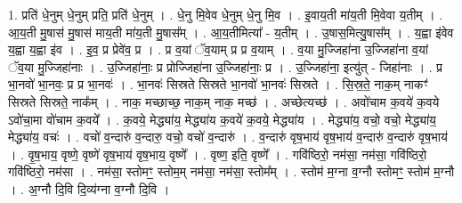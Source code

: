 \documentclass[17pt]{extarticle}
\begin{document}
1. प्रति॑ धे॒नुम् धे॒नुम् प्रति॒ प्रति॑ धे॒नुम् । . धे॒नु मि॒वेव धे॒नुम् धे॒नु मि॒व । . इ॒वाय॒ती मा॑य॒ती मि॒वेवा य॒तीम् । . आ॒य॒ती मु॒षास॑ मु॒षास॑ माय॒ती मा॑य॒ती मु॒षास᳚म् । . आ॒य॒तीमित्या᳚ - य॒तीम् । . उ॒षास॒मित्यु॒षास᳚म् । . य॒ह्वा इ॑वेव य॒ह्वा य॒ह्वा इ॑व । . इ॒व॒ प्र प्रेवे॑व॒ प्र । . प्र व॒यां ॅव॒याम् प्र प्र व॒याम् । . व॒या मु॒ज्जिहा॑ना उ॒ज्जिहा॑ना व॒यां ॅव॒या मु॒ज्जिहा॑नाः । . उ॒ज्जिहा॑नाः॒ प्र प्रोज्जिहा॑ना उ॒ज्जिहा॑नाः॒ प्र । . उ॒ज्जिहा॑ना॒ इत्यु॑त् - जिहा॑नाः । . प्र भा॒नवो॑ भा॒नवः॒ प्र प्र भा॒नवः॑ । . भा॒नवः॑ सिस्रते सिस्रते भा॒नवो॑ भा॒नवः॑ सिस्रते । . सि॒स्र॒ते॒ नाक॒म् नाकꣳ॑ सिस्रते सिस्रते॒ नाक᳚म् । . नाक॒ मच्छाच्छ॒ नाक॒म् नाक॒ मच्छ॑ । . अच्छेत्यच्छ॑ । . अवो॑चाम क॒वये॑ क॒वये ऽवो॑चा॒मा वो॑चाम क॒वये᳚ । . क॒वये॒ मेद्ध्या॑य॒ मेद्ध्या॑य क॒वये॑ क॒वये॒ मेद्ध्या॑य । . मेद्ध्या॑य॒ वचो॒ वचो॒ मेद्ध्या॑य॒ मेद्ध्या॑य॒ वचः॑ । . वचो॑ व॒न्दारु॑ व॒न्दारु॒ वचो॒ वचो॑ व॒न्दारु॑ । . व॒न्दारु॑ वृष॒भाय॑ वृष॒भाय॑ व॒न्दारु॑ व॒न्दारु॑ वृष॒भाय॑ । . वृ॒ष॒भाय॒ वृष्णे॒ वृष्णे॑ वृष॒भाय॑ वृष॒भाय॒ वृष्णे᳚ । . वृष्ण॒ इति॒ वृष्णे᳚ । . गवि॑ष्ठिरो॒ नम॑सा॒ नम॑सा॒ गवि॑ष्ठिरो॒ गवि॑ष्ठिरो॒ नम॑सा । . नम॑सा॒ स्तोमꣳ॒॒ स्तोम॒म् नम॑सा॒ नम॑सा॒ स्तोम᳚म् । . स्तोम॑ म॒ग्ना व॒ग्नौ स्तोमꣳ॒॒ स्तोम॑ म॒ग्नौ । . अ॒ग्नौ दि॒वि दि॒व्य॑ग्ना व॒ग्नौ दि॒वि । \newline
\end{document}
